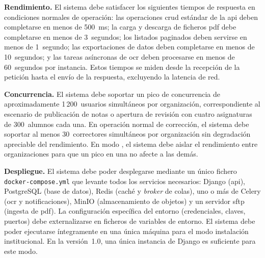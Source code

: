 
\item \textbf{Rendimiento.} \label{rnf:performance}
El sistema debe satisfacer los siguientes tiempos de respuesta en condiciones normales de
operación: las operaciones \acs{crud} estándar de la \acs{api} deben completarse en menos
de 500~ms; la carga y descarga de ficheros \acs{pdf} debe completarse en menos de
3~segundos; los listados paginados deben servirse en menos de 1~segundo; las exportaciones
de datos deben completarse en menos de 10~segundos; y las tareas asíncronas de \acs{ocr}
deben procesarse en menos de 60~segundos por instancia. Estos tiempos se miden desde la
recepción de la petición hasta el envío de la respuesta, excluyendo la latencia de red.

\item \textbf{Concurrencia.} \label{rnf:concurrency}
El sistema debe soportar un pico de concurrencia de aproximadamente 1\,200~usuarios
simultáneos por organización, correspondiente al escenario de publicación de notas o
apertura de revisión con cuatro asignaturas de 300~alumnos cada una. En operación normal de
corrección, el sistema debe soportar al menos 30~correctores simultáneos por organización
sin degradación apreciable del rendimiento. En modo , el sistema debe
aislar el rendimiento entre organizaciones para que un pico en una no afecte a las demás.

\item \textbf{Despliegue.} \label{rnf:deployment}
El sistema debe poder desplegarse mediante un único fichero \texttt{docker-compose.yml} que
levante todos los servicios necesarios: Django (\acs{api}), PostgreSQL (base de datos),
Redis (caché y \textit{broker} de colas), uno o más  de Celery (\acs{ocr} y
notificaciones), MinIO (almacenamiento de objetos) y un servidor \acs{sftp} (ingesta de
\acs{pdf}). La configuración específica del entorno (credenciales, claves, puertos) debe
externalizarse en ficheros de variables de entorno. El sistema debe poder ejecutarse
íntegramente en una única máquina para el modo instalación institucional. En la versión~1.0,
una única instancia de Django es suficiente para este modo.

